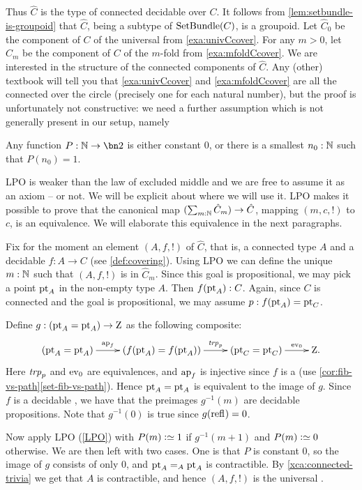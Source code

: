 Thus $\hat C$ is the type of connected decidable \coverings over $C$.
It follows from \cref{lem:setbundle-is-groupoid} that $\hat C$, 
being a subtype of $\mathrm{SetBundle}(C)$, is a groupoid.
Let $\hat C_0$ be the component of $C$ of the universal \covering
from \cref{exa:univCcover}. For any $m>0$, let $\hat C_m$ be the component of $C$
of the $m$-fold \covering from \cref{exa:mfoldCcover}.
We are interested in the structure of the connected components of $\hat C$. 
Any (other) textbook will tell you that \cref{exa:univCcover} and \cref{exa:mfoldCcover}
are all the connected \coverings over 
the circle (precisely one for each natural number), but the proof is unfortunately not constructive: 
we need a further assumption which is not generally present in our setup, namely

\begin{principle}
  \label{LPO}
  Any function $P:\NN\to\bn 2$ is either constant $0$,
  or there is a smallest $n_0:\mathbb{N}$ such that $P(n_0)=1$.
\end{principle}

LPO is weaker than the law of excluded middle and we are free to assume it as an axiom -- or not.
We will be explicit about where we will use it.
LPO makes it possible to prove that the canonical map $(\sum_{m:\mathbb{N}} \hat C_m) \to \hat C$,
mapping $(m,c,!)$ to $c$, is an equivalence.
We will elaborate this equivalence in the next paragraphs.

Fix for the moment an element $(A,f,!)$ of $\hat C$, that is,
a connected type $A$ and a decidable \covering  $f:A\to C$ (see \cref{def:covering}).
Using LPO we can define the unique $m:\mathbb{N}$ such that $(A,f,!)$ is in $\hat C_m$.
Since this goal is propositional, we may pick a point $\mathrm{pt}_A$ in 
the non-empty type $A$. Then $f(\mathrm{pt}_A) : C$. Again, since $C$ is connected
and the goal is propositional, we may assume $p: f(\mathrm{pt}_A) = \mathrm{pt}_C$.

Define $g: (\mathrm{pt}_A=\mathrm{pt}_A)\to\mathrm{Z}$ as the following composite:
\[
\xymatrix{
(\pt_A=\pt_A)\ar[r]^-{\ap{f}}&
(f(\pt_A)=f(\pt_A))\ar[r]^-{\trp{p}}&
(\pt_C=\pt_C)\ar[r]^-{\ev_0}&
\zet.}
\]
Here $\trp{p}$ and $\ev_0$ are equivalences, and $\ap{f}$ is injective
since $f$ is a \covering (use \cref{cor:fib-vs-path}\ref{set-fib-vs-path}).
Hence $\mathrm{pt}_A=\mathrm{pt}_A$ is equivalent to the image of $g$.
Since $f$ is a decidable \covering, we have that the preimages $g^{-1}(m)$
are decidable propositions. Note that $g^{-1}(0)$ is true since $g(\refl{})=0$.

Now apply LPO (\cref{LPO}) with $P(m)\defeq 1$ if $g^{-1}(m+1)$ and $P(m)\defeq 0$ otherwise.
We are then left with two cases.
One is that $P$ is constant $0$, so the image of $g$ consists of only $0$, 
and $\mathrm{pt}_A=_A\mathrm{pt}_A$ is contractible. By \cref{xca:connected-trivia}
we get that $A$ is contractible, and hence $(A,f,!)$ is the universal \covering.

